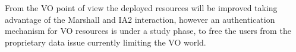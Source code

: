 From the VO point of view the deployed resources will be improved taking advantage of the Marshall and IA2 interaction, however an authentication mechanism for VO resources is under a study phase, to free the users from the proprietary data issue currently limiting the VO world.


